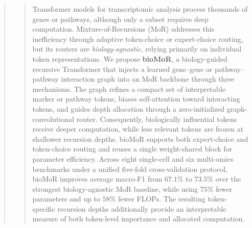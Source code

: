 \documentclass[letterpaper]{article}
\begin{document}
\begin{abstract}
    \begin{quote}

Transformer models for transcriptomic analysis process thousands of genes or pathways, although only a subset requires deep computation. Mixture-of-Recursions (MoR) addresses this inefficiency through adaptive token-choice or expert-choice routing, but its routers are \emph{biology-agnostic}, relying primarily on individual token representations. We propose \textbf{bioMoR}, a biology-guided recursive Transformer that injects a learned gene--gene or pathway--pathway interaction graph into an MoR backbone through three mechanisms. The graph refines a compact set of interpretable marker or pathway tokens, biases self-attention toward interacting tokens, and guides depth allocation through a zero-initialized graph-convolutional router. Consequently, biologically influential tokens receive deeper computation, while less relevant tokens are frozen at shallower recursion depths. bioMoR supports both expert-choice and token-choice routing and reuses a single weight-shared block for parameter efficiency. Across eight single-cell and six multi-omics benchmarks under a unified five-fold cross-validation protocol, bioMoR improves average macro-F1 from $67.1\%$ to $73.5\%$ over the strongest biology-agnostic MoR baseline, while using $75\%$ fewer parameters and up to $58\%$ fewer FLOPs. The resulting token-specific recursion depths additionally provide an interpretable measure of both token-level importance and allocated computation.
    \end{quote}
\end{abstract}
\end{document}
